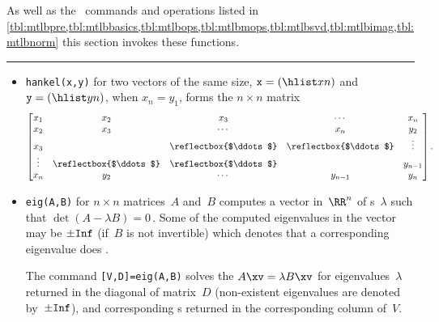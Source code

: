 \begin{table}
\caption{As well as the \script\ commands and operations listed in 
\cref{tbl:mtlbpre,tbl:mtlbbasics,tbl:mtlbops,tbl:mtlbmops,tbl:mtlbsvd,tbl:mtlbimag,tbl:mtlbnorm} this section invokes these functions.} \label{tbl:mtlbexpf}
\smallskip\hrule\smallskip
\begin{minipage}{\linewidth}
\begin{itemize}
\item {}\verb|hankel(x,y)| for two 
vectors of the same size, \(\verb|x|=(\hlist xn)\) and \(\verb|y|=(\hlist yn)\), when \(x_n=y_1\), forms the \(n\times n\) matrix
\def\adots{\reflectbox{$\ddots$}}
\begin{equation*}
\begin{bmatrix} 
x_1&x_2&x_3&\cdots&x_n \\
x_2&x_3&\cdots&x_n&y_2\\
x_3&&\adots&\adots&\vdots\\
\vdots&\adots&\adots&&y_{n-1}\\
x_n&y_2&\cdots&y_{n-1}&y_n
\end{bmatrix}.
\end{equation*}

\item {}\verb|eig(A,B)| for \(n\times n\) matrices~\(A\) and~\(B\) computes a vector in~\(\RR^n\) of s~\(\lambda\) such that \(\det(A-\lambda B)=0\)\,.
Some of the computed eigenvalues in the vector may be \(\pm\verb|Inf|\) (if~\(B\) is not invertible) which denotes that a corresponding eigenvalue does .

The command \verb|[V,D]=eig(A,B)| solves the  \(A\xv=\lambda B\xv\) for eigenvalues~\(\lambda\) returned in the diagonal of matrix~\(D\) (non-existent eigenvalues are denoted by~\(\pm\verb|Inf|\)), and corresponding s returned in the corresponding column of~\(V\).


\end{itemize}
\end{minipage}
\end{table}
